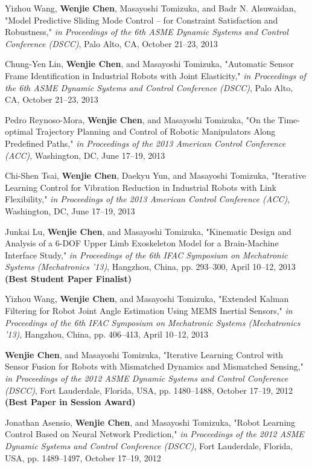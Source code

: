 \documentclass{res}
\begin{document}
\begin{resume}
\begin{etaremune}[start=20]
    \item Yizhou Wang, \textbf{Wenjie Chen}, Masayoshi Tomizuka, and Badr N. Alsuwaidan, "Model Predictive Sliding Mode Control -- for Constraint Satisfaction and Robustness," \emph{in Proceedings of the 6th ASME Dynamic Systems and Control Conference (DSCC)}, Palo Alto, CA, October 21--23, 2013
    \item Chung-Yen Lin, \textbf{Wenjie Chen}, and Masayoshi Tomizuka, "Automatic Sensor Frame Identification in Industrial Robots with Joint Elasticity," \emph{in Proceedings of the 6th ASME Dynamic Systems and Control Conference (DSCC)}, Palo Alto, CA, October 21--23, 2013
    \item Pedro Reynoso-Mora, \textbf{Wenjie Chen}, and Masayoshi Tomizuka, "On the Time-optimal Trajectory Planning and Control of Robotic Manipulators Along Predefined Paths," \emph{in Proceedings of the 2013 American Control Conference (ACC)}, Washington, DC, June 17--19, 2013
    \item Chi-Shen Tsai, \textbf{Wenjie Chen}, Daekyu Yun, and Masayoshi Tomizuka, "Iterative Learning Control for Vibration Reduction in Industrial Robots with Link Flexibility," \emph{in Proceedings of the 2013 American Control Conference (ACC)}, Washington, DC, June 17--19, 2013
    \item Junkai Lu, \textbf{Wenjie Chen}, and Masayoshi Tomizuka, "Kinematic Design and Analysis of a 6-DOF Upper Limb Exoskeleton Model for a Brain-Machine Interface Study," \emph{in Proceedings of the 6th IFAC Symposium on Mechatronic Systems (Mechatronics '13)}, Hangzhou, China, pp. 293--300, April 10--12, 2013 \textbf{(Best Student Paper Finalist)}
    \item Yizhou Wang, \textbf{Wenjie Chen}, and Masayoshi Tomizuka, "Extended Kalman Filtering for Robot Joint Angle Estimation Using MEMS Inertial Sensors,"  \emph{in Proceedings of the 6th IFAC Symposium on Mechatronic Systems (Mechatronics '13)}, Hangzhou, China, pp. 406--413, April 10--12, 2013
    \item \textbf{Wenjie Chen}, and Masayoshi Tomizuka, "Iterative Learning Control with Sensor Fusion for Robots with Mismatched Dynamics and Mismatched Sensing," \emph{in Proceedings of the 2012 ASME Dynamic Systems and Control Conference (DSCC)}, Fort Lauderdale, Florida, USA, pp. 1480--1488, October 17--19, 2012 \textbf{(Best Paper in Session Award)}
    \item Jonathan Asensio, \textbf{Wenjie Chen}, and Masayoshi Tomizuka, "Robot Learning Control Based on Neural Network Prediction," \emph{in Proceedings of the 2012 ASME Dynamic Systems and Control Conference (DSCC)}, Fort Lauderdale, Florida, USA, pp. 1489--1497, October 17--19, 2012

\end{etaremune}
\end{resume}
\end{document}
